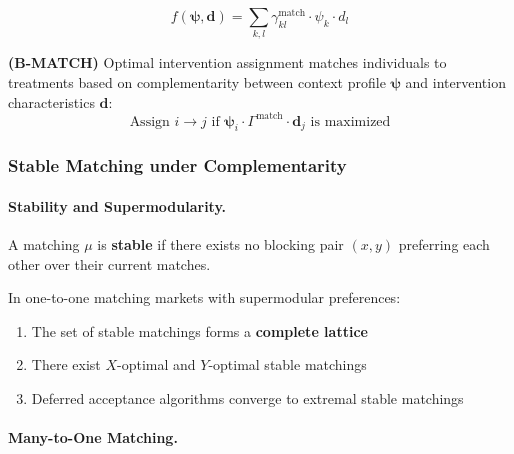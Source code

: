\begin{equation}
f(\boldsymbol{\psi}, \mathbf{d}) = \sum_{k,l} \gamma_{kl}^{\text{match}} \cdot \psi_k \cdot d_l
\end{equation}

\begin{axiom}
\label{ax:B-MATCH}
\textbf{(B-MATCH)} Optimal intervention assignment matches individuals to treatments 
based on complementarity between context profile $\boldsymbol{\psi}$ and intervention 
characteristics $\mathbf{d}$:
\begin{equation}
\text{Assign } i \to j \text{ if } \boldsymbol{\psi}_i \cdot \Gamma^{\text{match}} \cdot \mathbf{d}_j 
\text{ is maximized}
\end{equation}
\end{axiom}

\subsubsection{Stable Matching under Complementarity}

\paragraph{Stability and Supermodularity.}

\begin{definition}
\label{def:stable}
A matching $\mu$ is \textbf{stable} if there exists no blocking pair $(x, y)$ 
preferring each other over their current matches.
\end{definition}

\begin{theorem}
\label{thm:stable-lattice}
In one-to-one matching markets with supermodular preferences:
\begin{enumerate}
    \item The set of stable matchings forms a \textbf{complete lattice}
    \item There exist $X$-optimal and $Y$-optimal stable matchings
    \item Deferred acceptance algorithms converge to extremal stable matchings
\end{enumerate}
\end{theorem}

\paragraph{Many-to-One Matching.}

